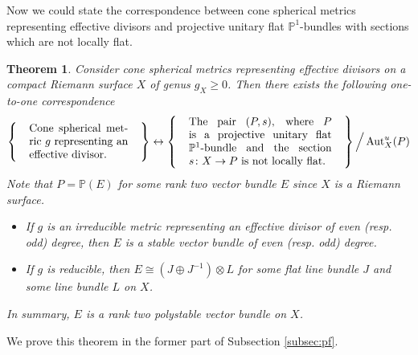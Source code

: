 \documentclass[12pt]{article}
\newtheorem{thm}{Theorem}[section]
\newtheorem{rem}{Remark}[section]
\begin{document}
Now we could state the correspondence between cone spherical metrics representing effective divisors and projective unitary flat $\mathbb P^{1}$-bundles with sections which are not locally flat. %
\begin{thm}
\label{thm:correspondence}
Consider cone spherical metrics representing effective divisors on a compact Riemann surface $X$ of genus $g_{X} \geq 0$. Then there exists the following one-to-one correspondence
\[ \left \{ \begin{array}{c} \begin{tabular}{p{9em}}
Cone spherical metric $g$ representing an effective divisor.
\end{tabular}\end{array}\right \} \leftrightarrow
\left \{ \begin{array}{c} \begin{tabular}{p{13em}}
The pair $(P, s)$, where $P$ is a projective unitary flat $\mathbb P^{1}$-bundle and the section $s \colon X \to P$ is not locally flat.
\end{tabular}\end{array} \right \} \Big/ \operatorname{Aut}_{X}^{u}(P) \]
Note that $P = \mathbb P(E)$ for some rank two vector bundle $E$ since $X$ is a Riemann surface.
\begin{itemize}
\item If $g$ is an irreducible metric representing an effective divisor of even {\rm (}resp. odd{\rm )} degree, then $E$ is a stable vector bundle of even {\rm (}resp. odd{\rm )} degree.
\item If $g$ is reducible, then $E \cong (J \oplus J^{-1})\otimes L$ for some flat line bundle $J$ and some line bundle $L$ on $X$.
\end{itemize}
In summary, $E$ is a rank two polystable vector bundle on $X$.
\end{thm}

We prove this theorem in the former part of Subsection \ref{subsec:pf}.

\end{document}
